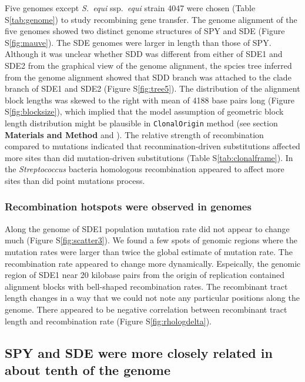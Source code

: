 \documentclass[english]{article}
\begin{document}
Five genomes except \textit{S.\ equi} ssp.\textit{\ equi} strain 4047 were
chosen (Table S\ref{tab:genome}) to study recombining gene transfer.  The genome
alignment of the five genomes showed two distinct genome structures of SPY and
SDE (Figure S\ref{fig:mauve}). The SDE genomes were larger in length than those
of SPY. Although it was unclear whether SDD was different from either of SDE1
and SDE2 from the graphical view of the genome alignment, the spcies tree
inferred from the genome alignment showed that SDD branch was attached to the
clade branch of SDE1 and SDE2 (Figure S\ref{fig:tree5}). The distribution of the
alignment block lengths was skewed to the right with mean of 4188 base pairs
long (Figure S\ref{fig:blocksize}), which implied that the model assumption of
geometric block length distribution might be plausible in \texttt{ClonalOrigin}
method (see section \textbf{Materials and Method} and \citealt{Didelot2010}).
The relative strength of recombination compared to mutations indicated that
reconmination-driven substitutions affected more sites than did mutation-driven
substitutions (Table S\ref{tab:clonalframe}). In the \textit{Streptococcus}
bacteria homologous recombination appeared to affect more sites than did point
mutations process.

\subsubsection{Recombination hotspots were observed in genomes}

Along the genome of SDE1 population mutation rate did not appear to change much
(Figure S\ref{fig:scatter3}).  We found a few spots of genomic regions where the
mutation rates were larger than twice the global estimate of mutation rate.  The
recombination rate appeared to change more dynamically. Espeically, the genomic
region of SDE1 near 20 kilobase pairs from the origin of replication contained
alignment blocks with bell-shaped recombination rates.  The recombinant tract
length changes in a way that we could not note any particular positions along
the genome.  There appeared to be negative correlation between recombinant tract
length and recombination rate (Figure S\ref{fig:rhologdelta}).

\subsection{SPY and SDE were more closely related in about tenth of the genome}
\end{document}
